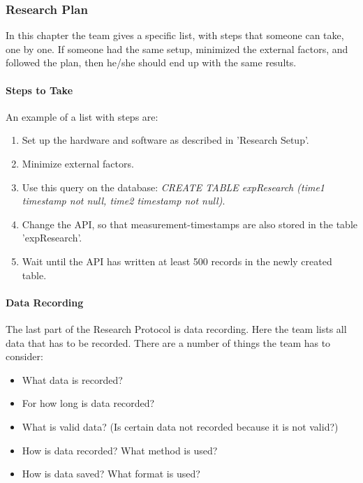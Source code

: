 \documentclass[10pt]{report}
\begin{document}
\subsubsection{Research Plan}

In this chapter the team gives a specific list, with steps that someone can take, one by one. If someone had the same setup, minimized the external factors, and followed the plan, then he/she should end up with the same results.

\paragraph{Steps to Take}

An example of a list with steps are:

\begin{enumerate}
	\item Set up the hardware and software as described in 'Research Setup'.
	\item Minimize external factors.
	\item Use this query on the database: \textit{CREATE TABLE expResearch (time1 timestamp not null, time2 timestamp not null)}.
	\item Change the API, so that measurement-timestamps are also stored in the table 'expResearch'. 
	\item Wait until the API has written at least 500 records in the newly created table.
\end{enumerate}

\paragraph{Data Recording}

The last part of the Research Protocol is data recording. Here the team lists all data that has to be recorded. There are a number of things the team has to consider:

\begin{itemize}
	\item What data is recorded?
	\item For how long is data recorded?
	\item What is valid data? (Is certain data not recorded because it is not valid?)
	\item How is data recorded? What method is used?
	\item How is data saved? What format is used?
\end{itemize}
\end{document}

